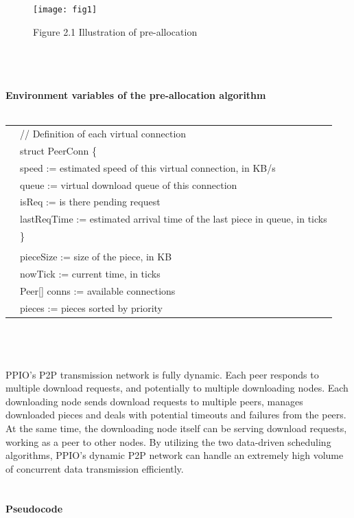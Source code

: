 \documentclass[10pt,a4paper]{article}
\begin{document}
\begin{figure}[!htb]   %
    \centering
    \texttt{[image: fig1]}
    \label{circuit}
    \centerline{{Figure 2.1 Illustration of pre-allocation}}
    \vspace{-2.5em}
\end{figure}
\noindent   
\\
\vspace{-0.5em}
\\ \\ {\bf Environment variables of the pre-allocation algorithm}
\vspace{-0.3em}
\\\\
\begin{tabular}{r|l}
\quad  & // Definition of each virtual connection  \\
\quad  & struct PeerConn \{   \\ 
 \quad &\qquad speed := estimated speed of this virtual connection, in KB/s  \\ 
 \quad &\qquad queue := virtual download queue of this connection     \\ 
 \quad &\qquad isReq := is there pending request    \\ 
 \quad &\qquad lastReqTime := estimated arrival time of the last piece in queue, in ticks   \\ 
 \quad &\}   \\ 
\\ 
\quad	&pieceSize := size of the piece, in KB  \\ 
\quad	&nowTick := current time, in ticks   \\ 
\quad	&Peer[] conns := available connections   \\
	&pieces := pieces sorted by priority   \\
\end{tabular}
\vspace{-0.5em}
\\\\\\
\noindent   
PPIO's P2P transmission network is fully dynamic. Each peer responds to multiple download requests, and potentially to multiple downloading nodes. Each downloading node sends download requests to multiple peers, manages downloaded pieces and deals with potential timeouts and failures from the peers. At the same time, the downloading node itself can be serving download requests, working as a peer to other nodes. By utilizing the two data-driven scheduling algorithms, PPIO's dynamic P2P network can handle an extremely high volume of concurrent data transmission efficiently.
\vspace{-0.7em}
\noindent   
\\
\vspace{-0.5em}
\\ \\ {\bf Pseudocode}\\
\vspace{-1em}
\end{document}
